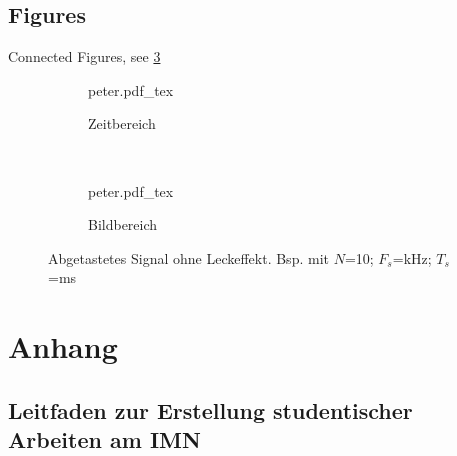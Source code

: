 \documentclass[12pt,
titlepage,
a4paper,
oneside,     %
openany,     %
listof=totoc,  %
numbers = noenddot, %
bibliography=totoc,    %
headsepline, %
]{scrbook} %
\begin{document}
\section{Figures}
\label{sec_figures}

Connected Figures, see \ref{fig:leck_toll}
\begin{figure}
	\centering
	\begin{subfigure}[b]{0.48\textwidth}
		\def\svgwidth{\columnwidth}
		{peter.pdf_tex}
		\caption{Zeitbereich}
		\label{leck_toll_t}
	\end{subfigure}
	~
	\begin{subfigure}[b]{0.48\textwidth}
		\def\svgwidth{\columnwidth}
		{peter.pdf_tex}
		\caption{Bildbereich}
		\label{leck_toll_f}
	\end{subfigure}
	\caption{Abgetastetes Signal ohne Leckeffekt. Bsp. mit $N$=10; $F_s$=\unit[1]{kHz}; $T_s$=\unit[10]{ms}}
	\label{fig:leck_toll}
\end{figure}


\printbibliography

\label{letzteSeite}
\appendix

\chapter{Anhang}
\label{cha_ausb}

\section{Leitfaden zur Erstellung studentischer Arbeiten am IMN}
\label{sec_Leitfaden}

\end{document}
